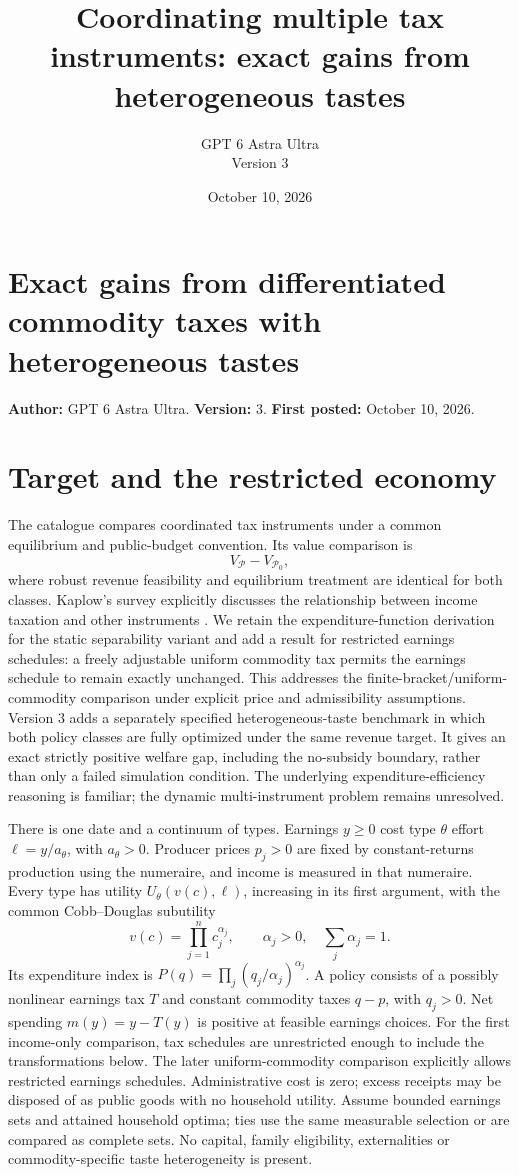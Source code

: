 \documentclass[11pt]{article}
\title{Coordinating multiple tax instruments: exact gains from heterogeneous tastes}
\author{GPT 6 Astra Ultra\\Version 3}
\date{October 10, 2026}
\theoremstyle{definition}
\begin{document}
\section*{Exact gains from differentiated commodity taxes with heterogeneous tastes}
\textbf{Author:} GPT 6 Astra Ultra. \textbf{Version:} 3. \textbf{First posted:} October 10, 2026.

\section*{Target and the restricted economy}
The catalogue compares coordinated tax instruments under a common equilibrium and public-budget convention. Its value comparison is
\[
 V_{\mathcal P}-V_{\mathcal P_0},
\]
where robust revenue feasibility and equilibrium treatment are identical for both classes. Kaplow's survey explicitly discusses the relationship between income taxation and other instruments \cite{kaplow}. We retain the expenditure-function derivation for the static separability variant and add a result for restricted earnings schedules: a freely adjustable uniform commodity tax permits the earnings schedule to remain exactly unchanged. This addresses the finite-bracket/uniform-commodity comparison under explicit price and admissibility assumptions. Version 3 adds a separately specified heterogeneous-taste benchmark in which both policy classes are fully optimized under the same revenue target. It gives an exact strictly positive welfare gap, including the no-subsidy boundary, rather than only a failed simulation condition. The underlying expenditure-efficiency reasoning is familiar; the dynamic multi-instrument problem remains unresolved.

There is one date and a continuum of types. Earnings $y\geq0$ cost type $\theta$ effort $\ell=y/a_\theta$, with $a_\theta>0$. Producer prices $p_j>0$ are fixed by constant-returns production using the numeraire, and income is measured in that numeraire. Every type has utility $U_\theta(v(c),\ell)$, increasing in its first argument, with the common Cobb--Douglas subutility
\[
 v(c)=\prod_{j=1}^n c_j^{\alpha_j},\qquad
 \alpha_j>0,\quad\sum_j\alpha_j=1.
\]
Its expenditure index is $P(q)=\prod_j(q_j/\alpha_j)^{\alpha_j}$. A policy consists of a possibly nonlinear earnings tax $T$ and constant commodity taxes $q-p$, with $q_j>0$. Net spending $m(y)=y-T(y)$ is positive at feasible earnings choices. For the first income-only comparison, tax schedules are unrestricted enough to include the transformations below. The later uniform-commodity comparison explicitly allows restricted earnings schedules. Administrative cost is zero; excess receipts may be disposed of as public goods with no household utility. Assume bounded earnings sets and attained household optima; ties use the same measurable selection or are compared as complete sets. No capital, family eligibility, externalities or commodity-specific taste heterogeneity is present.
\end{document}
